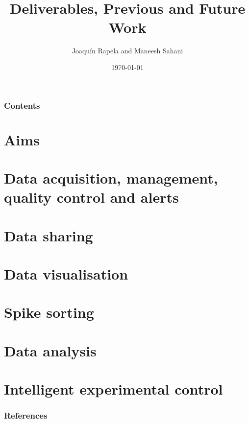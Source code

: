 \documentclass{beamer}
\title{Deliverables, Previous and Future Work}
\author[]{Joaqu\'{i}n Rapela and Maneesh Sahani}
\institute{Gatsby Computational Neuroscience Unit}
\date{\today}
\begin{document}
\frame{\titlepage}

\begin{frame}
    \frametitle{Contents}

    \tableofcontents

\end{frame}

\section{Aims}



\section{Data acquisition, management, quality control and alerts}



\section{Data sharing}



\section{Data visualisation}



\section{Spike sorting}



\section{Data analysis}



\section{Intelligent experimental control}



\begin{frame}[allowframebreaks]
    \frametitle{References}

    
    

\end{frame}
\end{document}

